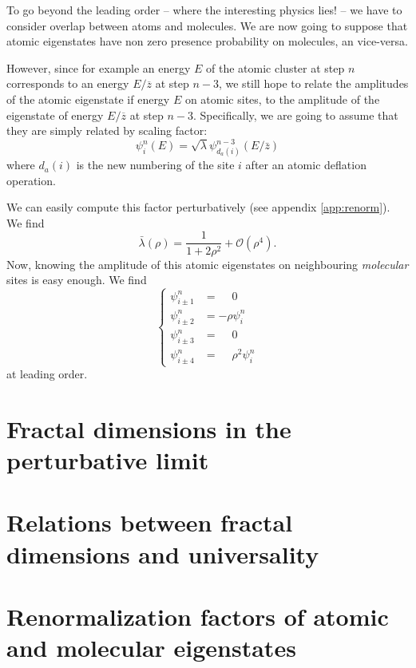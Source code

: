 \documentclass[11pt]{article}
\newcommand{\zb}{\ensuremath{\overline{z}}}
\begin{document}
To go beyond the leading order -- where the interesting physics lies! -- we have to consider overlap between atoms and molecules. We are now going to suppose that atomic eigenstates have non zero presence probability on molecules, an vice-versa.

However, since for example an energy $E$ of the atomic cluster at step $n$ corresponds to an energy $E/\zb$ at step $n-3$, we still hope to relate the amplitudes of the atomic eigenstate if energy $E$ on atomic sites, to the amplitude of the eigenstate of energy $E/\zb$ at step $n-3$. Specifically, we are going to assume that they are simply related by scaling factor:
 \begin{equation}
\label{eq:renorm_a}
	\psi_i^n(E) = \sqrt{\lambda} \psi^{n-3}_{d_a(i)}(E/\bar z)
\end{equation}
where $d_a(i)$ is the new numbering of the site $i$ after an atomic deflation operation.

We can easily compute this factor perturbatively (see appendix \eqref{app:renorm}). We find
\begin{equation}
	\bar \lambda(\rho) = \frac{1}{1+2\rho^2} +\mathcal{O}(\rho^4).
\end{equation}
Now, knowing the amplitude of this atomic eigenstates on neighbouring \emph{molecular} sites is easy enough. We find
\begin{equation}
	\begin{cases}
	\psi^n_{i\pm1} &= \phantom{-}0 \\
	\psi^n_{i\pm2} &= - \rho \psi^n_i \\
	\psi^n_{i\pm3} &= \phantom{-}0 \\
	\psi^n_{i\pm4} &= \phantom{-}\rho^2 \psi^n_i
	\end{cases}
\end{equation}
at leading order.

\section{Fractal dimensions in the perturbative limit}

\section{Relations between fractal dimensions and universality}

\newpage
\appendix

\section{Renormalization factors of atomic and molecular eigenstates}
\label{app:renorm}
\end{document}

